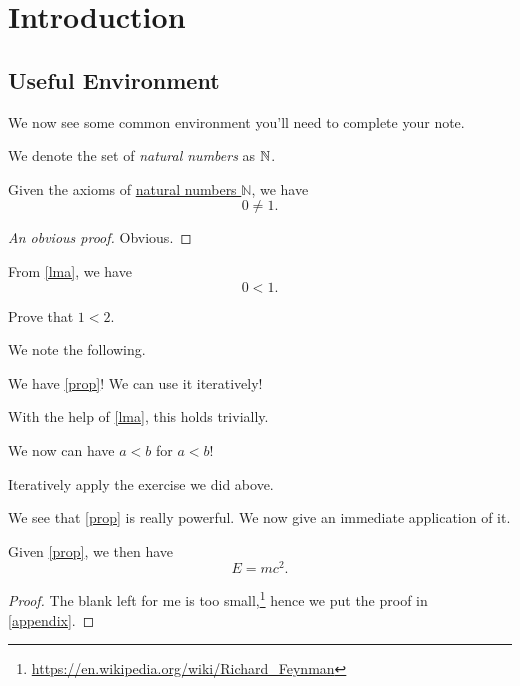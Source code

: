 \chapter{Introduction}
\section{Useful Environment}
We now see some common environment you'll need to complete your note.

\begin{definition}\label{def}
  We denote the set of \emph{natural numbers} as \(\mathbb{\MakeUppercase{n}} \).
\end{definition}


\begin{lemma}\label{lma}
  Given the axioms of \hyperref[def]{natural numbers \(\mathbb{N}\)}, we have
  \[
    0\neq 1.
  \]
\end{lemma}
\begin{proof}[An obvious proof]
  Obvious.
\end{proof}
\begin{proposition}\label{prop}
  From \autoref{lma}, we have
  \[
    0<1.
  \]
\end{proposition}
\begin{exercise}
  Prove that \(1 < 2\).
\end{exercise}
\begin{answer}
  We note the following.
  \begin{note}
    We have \autoref{prop}! We can use it iteratively!
  \end{note}
  With the help of \autoref{lma}, this holds trivially.
\end{answer}
\begin{eg}
  We now can have \(a < b\) for \(a < b\)!
\end{eg}
\begin{explanation}
  Iteratively apply the exercise we did above.
\end{explanation}
\begin{remark}
  We see that \autoref{prop} is really powerful. We now give an immediate application of it.
\end{remark}

\begin{theorem}\label{thm}
  Given \autoref{prop}, we then have
  \[
    E = mc^2.
  \]
\end{theorem}
\begin{proof}
  The blank left for me is too small,\footnote{\url{https://en.wikipedia.org/wiki/Richard_Feynman}} hence we put the proof in \autoref{appendix}.
\end{proof}

